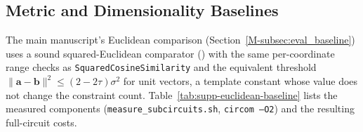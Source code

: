 \documentclass[10pt,letterpaper,journal]{IEEEtran}
\begin{document}
\subsection{Metric and Dimensionality Baselines}
\label{sec:supp-euclidean-derivation}

The main manuscript's Euclidean comparison (Section~\ref{M-subsec:eval_baseline}) uses a sound squared-Euclidean comparator () with the same per-coordinate range checks as \texttt{SquaredCosineSimilarity} and the equivalent threshold $\|\mathbf{a}-\mathbf{b}\|^2 \le (2-2\tau)\sigma^2$ for unit vectors, a template constant whose value does not change the constraint count. Table~\ref{tab:supp-euclidean-baseline} lists the measured components (\texttt{measure\_subcircuits.sh}, \texttt{circom --O2}) and the resulting full-circuit costs.

\begin{table}[h]
\centering
\caption{Metric and Dimensionality Baselines: Measured Components and Full-Circuit Cost (Face)}
\label{tab:supp-euclidean-baseline}
\setlength{\tabcolsep}{3.5pt}
\renewcommand{\arraystretch}{1.1}
\end{table}
\end{document}
